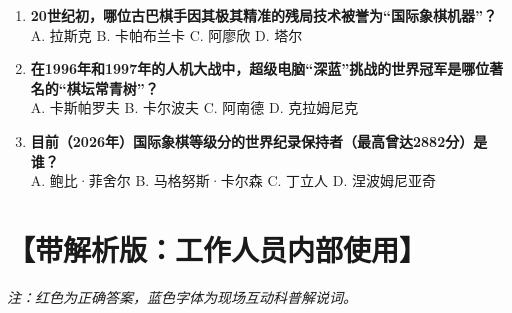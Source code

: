 \documentclass[a4paper, 11pt]{ctexart}
\begin{document}
\begin{enumerate}[label=\arabic*., itemsep=1.5em]
    \item \textbf{20世纪初，哪位古巴棋手因其极其精准的残局技术被誉为“国际象棋机器”？} \\
    A. 拉斯克 \qquad B. 卡帕布兰卡 \qquad C. 阿廖欣 \qquad D. 塔尔

    \item \textbf{在1996年和1997年的人机大战中，超级电脑“深蓝”挑战的世界冠军是哪位著名的“棋坛常青树”？} \\
    A. 卡斯帕罗夫 \qquad B. 卡尔波夫 \qquad C. 阿南德 \qquad D. 克拉姆尼克

    \item \textbf{目前（2026年）国际象棋等级分的世界纪录保持者（最高曾达2882分）是谁？} \\
    A. 鲍比·菲舍尔 \qquad B. 马格努斯·卡尔森 \qquad C. 丁立人 \qquad D. 涅波姆尼亚奇

\end{enumerate}

\newpage

\section*{【带解析版：工作人员内部使用】}
\textit{注：红色为正确答案，蓝色字体为现场互动科普解说词。}
\vspace{1em}
\end{document}
